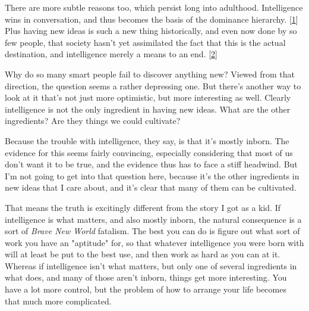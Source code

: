 There are
                  more subtle reasons too, which persist long into adulthood.
                  Intelligence wins in conversation, and thus becomes the basis
                  of the dominance hierarchy.
                  [\href{\#f1n}{1}]
                  Plus having new ideas is such a new thing historically, and
                  even now done by so few people, that society hasn't yet
                  assimilated the fact that this is the actual destination, and
                  intelligence merely a means to an end.
                  [\href{\#f2n}{2}]

Why do so many smart people fail to discover
                  anything new? Viewed from that direction, the question seems a
                  rather depressing one. But there's another way to look at it
                  that's not just more optimistic, but more interesting as well.
                  Clearly intelligence is not the only ingredient in having new
                  ideas. What are the other ingredients? Are they things we
                  could cultivate?

Because the trouble with
                  intelligence, they say, is that it's mostly inborn. The
                  evidence for this seems fairly convincing, especially
                  considering that most of us don't want it to be true, and the
                  evidence thus has to face a stiff headwind. But I'm not going
                  to get into that question here, because it's the other
                  ingredients in new ideas that I care about, and it's clear
                  that many of them can be cultivated.

That means the
                  truth is excitingly different from the story I got as a kid.
                  If intelligence is what matters, and also mostly inborn, the
                  natural consequence is a sort of
                  \emph{Brave New World} fatalism. The best you can do is figure
                  out what sort of work you have an "aptitude" for, so that
                  whatever intelligence you were born with will at least be put
                  to the best use, and then work as hard as you can at it.
                  Whereas if intelligence isn't what matters, but only one of
                  several ingredients in what does, and many of those aren't
                  inborn, things get more interesting. You have a lot more
                  control, but the problem of how to arrange your life becomes
                  that much more complicated.

